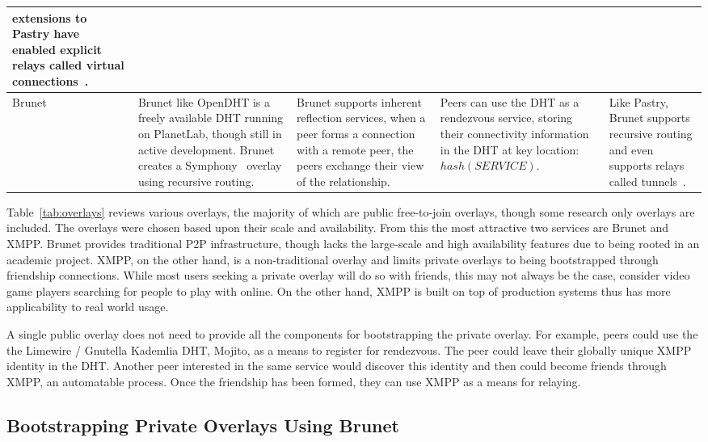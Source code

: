 \documentclass[conference]{IEEEtran}
\begin{document}
\begin{table*}[h!t!]
\begin{tabular}[c]{|m{1.5cm}||m{5.5cm}|m{3cm}|m{3cm}|m{3cm}|}
extensions to Pastry have enabled explicit relays called virtual
connections~\cite{epost}.
\\ \hline
Brunet~\cite{brunet} &
Brunet like OpenDHT is a freely available DHT running on PlanetLab, though
still in active development.  Brunet creates a Symphony~\cite{symphony} overlay
using recursive routing.
&
Brunet supports inherent reflection services, when a peer forms a connection
with a remote peer, the peers exchange their view of the relationship.
&
Peers can use the DHT as a rendezvous service, storing their connectivity
information in the DHT at key location:  $hash(SERVICE)$.
&
Like Pastry, Brunet supports recursive routing and even supports relays called
tunnels~\cite{hpdc08_0}.
\\ \hline
\end{tabular}
\caption{}
\label{tab:overlays}
\end{table*}

Table~\ref{tab:overlays} reviews various overlays, the majority of which are
public free-to-join overlays, though some research only overlays are included.
The overlays were chosen based upon their scale and availability.  From this
the most attractive two services are Brunet and XMPP.  Brunet provides
traditional P2P infrastructure, though lacks the large-scale and high
availability features due to being rooted in an academic project.  XMPP,
on the other hand, is a non-traditional overlay and limits private overlays
to being bootstrapped through friendship connections.  While most users
seeking a private overlay will do so with friends, this may not always be the
case, consider video game players searching for people to play with online.
On the other hand, XMPP is built on top of production systems thus has
more applicability to real world usage.

A single public overlay does not need to provide all the components for
bootstrapping the private overlay.  For example, peers could use the the
Limewire / Gnutella Kademlia DHT, Mojito, as a means to register for
rendezvous.  The peer could leave their globally unique XMPP identity in the
DHT.  Another peer interested in the same service would discover this identity
and then could become friends through XMPP, an automatable process.  Once the
friendship has been formed, they can use XMPP as a means for relaying.

\subsection{Bootstrapping Private Overlays Using Brunet}
\label{brunet_bootstrapping}
\end{document}
